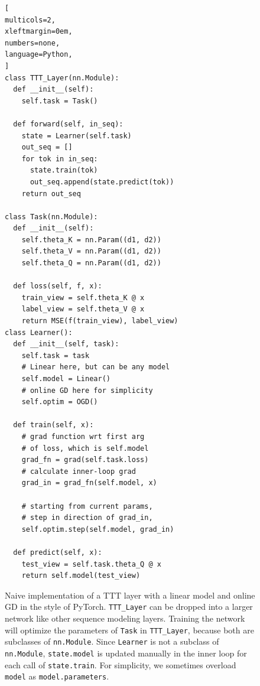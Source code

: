 \begin{figure}[t]
\vspace{-3ex}
\begin{lstlisting}[
multicols=2,
xleftmargin=0em, 
numbers=none,
language=Python, 
]
class TTT_Layer(nn.Module):
  def __init__(self):
    self.task = Task()

  def forward(self, in_seq):
    state = Learner(self.task)
    out_seq = []
    for tok in in_seq:
      state.train(tok)
      out_seq.append(state.predict(tok))
    return out_seq

class Task(nn.Module):
  def __init__(self):
    self.theta_K = nn.Param((d1, d2))
    self.theta_V = nn.Param((d1, d2))
    self.theta_Q = nn.Param((d1, d2))

  def loss(self, f, x):
    train_view = self.theta_K @ x
    label_view = self.theta_V @ x
    return MSE(f(train_view), label_view)
class Learner():
  def __init__(self, task):
    self.task = task
    # Linear here, but can be any model
    self.model = Linear()
    # online GD here for simplicity
    self.optim = OGD()

  def train(self, x):
    # grad function wrt first arg
    # of loss, which is self.model
    grad_fn = grad(self.task.loss)    
    # calculate inner-loop grad
    grad_in = grad_fn(self.model, x)

    # starting from current params,
    # step in direction of grad_in, 
    self.optim.step(self.model, grad_in)
    
  def predict(self, x):
    test_view = self.task.theta_Q @ x
    return self.model(test_view)
\end{lstlisting}
\vspace{1.5ex}
\caption{
Naive implementation of a TTT layer with a linear model and online GD in the style of PyTorch.
\texttt{TTT\_Layer} can be dropped into a larger network like other sequence modeling layers. 
Training the network will optimize the parameters of \texttt{Task} in \texttt{TTT\_Layer}, because both are subclasses of \texttt{nn.Module}.
Since \texttt{Learner} is not a subclass of \texttt{nn.Module}, \texttt{state.model} is updated manually in the inner loop for each call of \texttt{state.train}.
For simplicity, we sometimes overload \texttt{model} as \texttt{model.parameters}.
}
\label{fig:code}
\end{figure}
